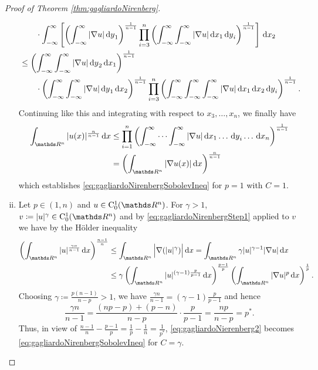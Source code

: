 \begin{proof}[Proof of Theorem \ref{thm:gagliardoNirenberg}]
\begin{enumerate}[i)]
\begin{align*}
        &\quad\quad \cdot \int_{-\infty}^\infty  \left[ \left( \int_{-\infty}^\infty |\nabla u| \d y_1 \right)^{\frac{1}{n - 1}} \prod_{i = 3}^n \left( \int_{-\infty}^\infty \int_{-\infty}^\infty  |\nabla u| \d x_1 \d y_i \right)^{\frac{1}{n - 1}} \right] \d x_2 \\
        &\leq \left( \int_{-\infty}^\infty \int_{-\infty}^\infty |\nabla u| \d y_2 \d x_1 \right)^{\frac{1}{n - 1}} \\
        &\quad\quad \cdot \left( \int_{-\infty}^\infty \int_{-\infty}^\infty | \nabla u| \d y_1 \d x_2 \right)^{\frac{1}{n - 1}} \prod_{i = 3}^n \left( \int_{-\infty}^\infty \int_{-\infty}^\infty \int_{-\infty}^\infty |\nabla u| \d x_1 \d x_2 \d y_i  \right)^{\frac{1}{n - 1}}.
      \end{align*}
      Continuing like this and integrating with respect to $x_3,\dots,x_n$, we finally have
      \begin{align}
        \begin{split}
        \label{eq:gagliardoNirenbergStep1}
        \int_{\R^n} |u(x)|^{\frac{n}{n - 1}} \d x
        &\leq \prod_{i = 1}^n \left( \int_{-\infty}^\infty \cdots \int_{-\infty}^\infty |\nabla u| \d x_1 \dots \d y_i  \dots \d x_n \right)^{\frac{1}{n - 1}} \\
        &= \left( \int_{\R^n} |\nabla u(x)| \d x \right)^{\frac{n}{n - 1}}
        \end{split}
      \end{align}
      which establishes \eqref{eq:gagliardoNirenbergSobolevIneq} for $p = 1$ with $C = 1$.

    \item Let $p \in (1,n)$ and $u \in \CC_0^1(\R^n)$.
      For $\gamma > 1$, $v \coloneqq |u|^\gamma \in \CC_0^1(\R^n)$ and by \eqref{eq:gagliardoNirenbergStep1} applied to $v$ we have by the Hölder inequality
      \begin{align}
        \begin{split}
        \label{eq:gagliardoNierenberg2}
        \left(\int_{\R^n} |u|^{\frac{\gamma n}{n - 1}} \d x\right)^{\frac{n - 1}{n}}
        &\leq \int_{\R^n} \Big| \nabla (|u|^\gamma) \Big| \d x 
        = \int_{\R^n} \gamma | u|^{\gamma - 1} | \nabla u| \d x \\ 
        &\leq \gamma \left(\int_{\R^n} |u|^{(\gamma - 1) \frac{p}{p - 1}} \d x \right)^{\frac{p - 1}{p}} \left( \int_{\R^n} | \nabla u|^p \d x \right)^{\frac{1}{p}}.
        \end{split}
      \end{align}
      Choosing $\gamma \coloneqq \frac{p (n - 1)}{n - p} > 1$, we have $\frac{\gamma n}{n - 1} = (\gamma - 1)\frac{p}{p - 1}$ and hence
      $$
      \frac{\gamma n}{n - 1} = \frac{(np - p) + (p - n)}{n - p} \cdot \frac{p }{p - 1} = \frac{n p }{n - p} = p^*.
      $$
      Thus, in view of $\frac{n - 1}{n} - \frac{p - 1}{p} = \frac{1}{p} - \frac{1}{n} = \frac{1}{p^*}$, \eqref{eq:gagliardoNierenberg2} becomes \eqref{eq:gagliardoNirenbergSobolevIneq} for $C = \gamma$.


\end{enumerate}
\end{proof}
